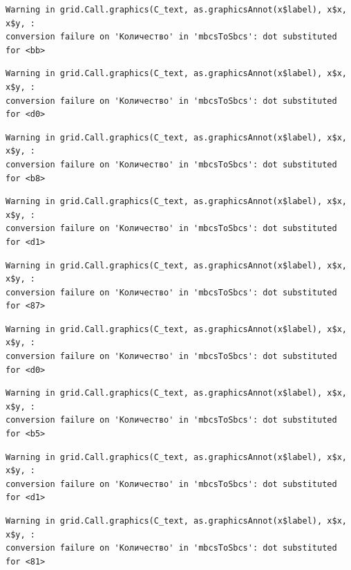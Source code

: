 \documentclass[
  letterpaper,
  DIV=11,
  numbers=noendperiod]{scrreprt}
\theoremstyle{definition}
\theoremstyle{remark}
\begin{document}
\begin{verbatim}
Warning in grid.Call.graphics(C_text, as.graphicsAnnot(x$label), x$x, x$y, :
conversion failure on 'Количество' in 'mbcsToSbcs': dot substituted for <bb>
\end{verbatim}

\begin{verbatim}
Warning in grid.Call.graphics(C_text, as.graphicsAnnot(x$label), x$x, x$y, :
conversion failure on 'Количество' in 'mbcsToSbcs': dot substituted for <d0>
\end{verbatim}

\begin{verbatim}
Warning in grid.Call.graphics(C_text, as.graphicsAnnot(x$label), x$x, x$y, :
conversion failure on 'Количество' in 'mbcsToSbcs': dot substituted for <b8>
\end{verbatim}

\begin{verbatim}
Warning in grid.Call.graphics(C_text, as.graphicsAnnot(x$label), x$x, x$y, :
conversion failure on 'Количество' in 'mbcsToSbcs': dot substituted for <d1>
\end{verbatim}

\begin{verbatim}
Warning in grid.Call.graphics(C_text, as.graphicsAnnot(x$label), x$x, x$y, :
conversion failure on 'Количество' in 'mbcsToSbcs': dot substituted for <87>
\end{verbatim}

\begin{verbatim}
Warning in grid.Call.graphics(C_text, as.graphicsAnnot(x$label), x$x, x$y, :
conversion failure on 'Количество' in 'mbcsToSbcs': dot substituted for <d0>
\end{verbatim}

\begin{verbatim}
Warning in grid.Call.graphics(C_text, as.graphicsAnnot(x$label), x$x, x$y, :
conversion failure on 'Количество' in 'mbcsToSbcs': dot substituted for <b5>
\end{verbatim}

\begin{verbatim}
Warning in grid.Call.graphics(C_text, as.graphicsAnnot(x$label), x$x, x$y, :
conversion failure on 'Количество' in 'mbcsToSbcs': dot substituted for <d1>
\end{verbatim}

\begin{verbatim}
Warning in grid.Call.graphics(C_text, as.graphicsAnnot(x$label), x$x, x$y, :
conversion failure on 'Количество' in 'mbcsToSbcs': dot substituted for <81>
\end{verbatim}
\end{document}
